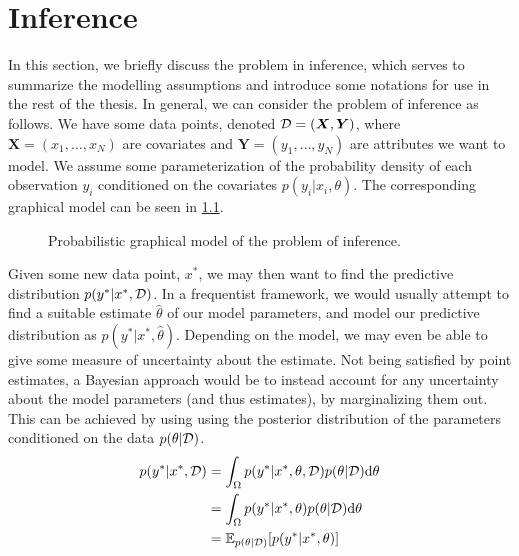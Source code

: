 \chapter{Inference}

In this section, we briefly discuss the problem in inference, which serves to summarize the modelling assumptions and introduce some notations for use in the rest of the thesis. 
In general, we can consider the problem of inference as follows.
We have some data points, denoted $\mathcal{D} = (\bm{X}, \bm{Y})$, where $\bm{X} = (x_1,\dots,x_N)$ are covariates and $\bm{Y} = (y_1, \dots, y_N)$ are attributes we want to model. 
We assume some parameterization of the probability density of each observation $y_i$ conditioned on the covariates $p(y_i|x_i,\theta)$.
The corresponding graphical model can be seen in \cref{fig:pgm}. 
\begin{figure}[htbp]
    \centering
    \caption{Probabilistic graphical model of the problem of inference.}
    \label{fig:pgm}
\end{figure}
Given some new data point, $x^\ast$, we may then want to find the predictive distribution $p(y^\ast | x^\ast, \mathcal{D})$. 
In a frequentist framework, we would usually attempt to find a suitable estimate $\hat{\theta}$ of our model parameters, and model our predictive distribution as $p(y^\ast | x^\ast, \hat{\theta})$.
Depending on the model, we may even be able to give some measure of uncertainty about the estimate.
Not being satisfied by point estimates, a Bayesian approach would be to instead account for any uncertainty about the model parameters (and thus estimates), by marginalizing them out. 
This can be achieved by using using the posterior distribution of the parameters conditioned on the data $p(\theta|\mathcal{D})$.
\begin{equation}\label{eq:inference}
    \begin{aligned}
        p(y^\ast | x^\ast, \mathcal{D}) &= \int_{\Omega} p(y^\ast | x^\ast, \theta, \mathcal{D})  p(\theta|\mathcal{D}) \dd\theta \\
        &= \int_{\Omega} p(y^\ast | x^\ast, \theta)  p(\theta|\mathcal{D}) \dd\theta\\
        &= \operatorname{\mathbb{E}}_{p(\theta|\mathcal{D})} [p(y^\ast | x^\ast, \theta)] 
    \end{aligned}
\end{equation}
